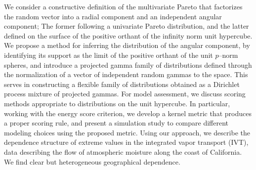 We consider a constructive definition of the multivariate Pareto that factorizes the 
random vector into a radial component and an independent angular component; The former
following a univariate Pareto distribution, and the latter defined on the surface of the 
positive orthant of the infinity norm unit hypercube.   We propose a method 
for inferring the distribution of the angular component, by identifying its support 
as the limit of the positive orthant of the unit $p$--norm spheres, and introduce a 
projected gamma family of distributions defined through the normalization of a vector of 
independent random gammas to the space.   This serves in constructing a flexible family of
distributions obtained as a Dirichlet process mixture of projected gammas.  For model 
assessment, we discuss scoring methods appropriate to distributions on the unit hypercube.  
In particular, working with the energy score criterion, we develop a kernel metric that 
produces a proper scoring rule, and present 
a simulation study to compare different modeling choices using the proposed metric.    
Using our approach, we describe the dependence structure of extreme values in the
integrated vapor transport (IVT), data describing the flow of atmospheric moisture 
along the coast of California.  We find clear but heterogeneous geographical dependence.